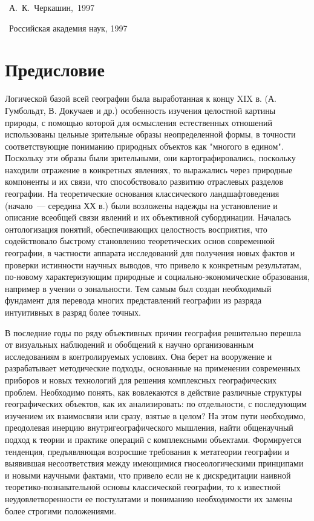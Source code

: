 \documentclass[draft,openany,14pt]{extbook}
\begin{document}
\vfill{}
\noindent{}\begin{minipage}[t]{10em}
\mbox{}\par
\ISBN{}
\end{minipage}\hfill
\begin{minipage}[t]{0.51\linewidth{}}
\noindent\sucopyright~А.~К.~Черкашин,~1997\par
\noindent\sucopyright~Российская академия наук, 1997
\end{minipage}
\endgroup
\newpage
\tableofcontents{}
\chapter*{Предисловие}
Логической базой всей географии была выработанная к концу XIX в. (А. Гумбольдт, В. Докучаев и др.) особенность изучения целостной картины природы, с помощью которой для осмысления естественных отношений использованы цельные зрительные образы неопределенной формы, в точности соответствующие пониманию природных объектов как "многого в едином". Поскольку эти образы были зрительными, они картографировались, поскольку находили отражение в конкретных явлениях, то выражались через природные компоненты и их связи, что способствовало развитию отраслевых разделов географии. На теоретические основания классического ландшафтоведения (начало~--- середина ХХ в.) были возложены надежды на установление и описание всеобщей связи явлений и их объективной субординации. Началась онтологизация понятий, обеспечивающих целостность восприятия, что содействовало быстрому становлению теоретических основ современной географии, в частности аппарата исследований для получения новых фактов и проверки истинности научных выводов, что привело к конкретным результатам, по-новому характеризующим природные и социально-экономические образования, например в учении о зональности. Тем самым был создан необходимый фундамент для перевода многих представлений географии из разряда интуитивных в разряд более точных.

В последние годы по ряду объективных причин география решительно перешла от визуальных наблюдений и обобщений к научно организованным исследованиям в контролируемых условиях. Она берет на вооружение и разрабатывает методические подходы, основанные на применении современных приборов и новых технологий для решения комплексных географических проблем. Необходимо понять, как вовлекаются в действие различные структуры географических объектов, как их анализировать: по отдельности, с последующим изучением их взаимосвязи или сразу, взятые в целом? На этом пути необходимо, преодолевая инерцию внутригеографического мышления, найти общенаучный подход к теории и практике операций с комплексными объектами. Формируется тенденция, предъявляющая возросшие требования к метатеории географии и выявившая несоответствия между имеющимися гносеологическими принципами и новыми научными фактами, что привело если не к дискредитации наивной теоретико-познавательной основы классической географии, то к известной неудовлетворенности ее постулатами и пониманию необходимости их замены более строгими положениями.
\end{document}
